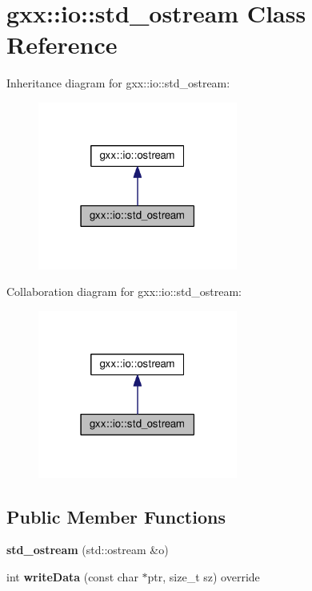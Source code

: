 \hypertarget{classgxx_1_1io_1_1std__ostream}{}\section{gxx\+:\+:io\+:\+:std\+\_\+ostream Class Reference}
\label{classgxx_1_1io_1_1std__ostream}


Inheritance diagram for gxx\+:\+:io\+:\+:std\+\_\+ostream\+:
\nopagebreak
\begin{figure}[H]
\begin{center}
\leavevmode
\includegraphics[width=186pt]{classgxx_1_1io_1_1std__ostream__inherit__graph}
\end{center}
\end{figure}


Collaboration diagram for gxx\+:\+:io\+:\+:std\+\_\+ostream\+:
\nopagebreak
\begin{figure}[H]
\begin{center}
\leavevmode
\includegraphics[width=186pt]{classgxx_1_1io_1_1std__ostream__coll__graph}
\end{center}
\end{figure}
\subsection*{Public Member Functions}
\begin{DoxyCompactItemize}
\item 
{\bfseries std\+\_\+ostream} (std\+::ostream \&o)\hypertarget{classgxx_1_1io_1_1std__ostream_a8cb4816d6c5d100816583ce27ecc8d3b}{}\label{classgxx_1_1io_1_1std__ostream_a8cb4816d6c5d100816583ce27ecc8d3b}

\item 
int {\bfseries write\+Data} (const char $\ast$ptr, size\+\_\+t sz) override\hypertarget{classgxx_1_1io_1_1std__ostream_a2c983c74ba9a0eb997aee3eb213511c6}{}\label{classgxx_1_1io_1_1std__ostream_a2c983c74ba9a0eb997aee3eb213511c6}

\end{DoxyCompactItemize}
